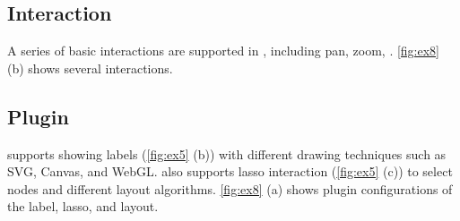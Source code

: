 

\subsection{Interaction}
A series of basic interactions are supported in \name, including pan, zoom,   . \autoref{fig:ex8} (b) shows several  interactions.

\subsection{Plugin}

\name supports showing labels (\autoref{fig:ex5} (b)) with different drawing techniques\added[id=kg]{,} such as SVG, Canvas, and WebGL. \name also supports lasso interaction (\autoref{fig:ex5} (c)) to select nodes and different layout algorithms. \autoref{fig:ex8} (a) shows  plugin configurations of the label, lasso, and layout.


